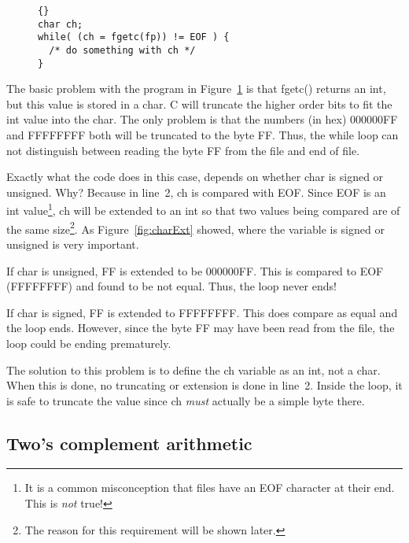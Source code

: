 \begin{figure}[t]
\begin{lstlisting}[stepnumber=0,frame=tlrb]{}
char ch;
while( (ch = fgetc(fp)) != EOF ) {
  /* do something with ch */
}
\end{lstlisting}
\caption{}
\label{fig:IObug}
\end{figure}

The basic problem with the program in Figure~\ref{fig:IObug} is that
{\code fgetc()} returns an {\code int}, but this value is stored in a
{\code char}. C will truncate the higher order bits to fit the {\code
int} value into the {\code char}. The only problem is that the numbers
(in hex) {\code 000000FF} and {\code FFFFFFFF} both will be truncated
to the byte {\code FF}. Thus, the while loop can not distinguish
between reading the byte {\code FF} from the file and end of file.

Exactly what the code does in this case, depends on whether {\code char} is
signed or unsigned. Why? Because in line~2, {\code ch} is compared with 
{\code EOF}. Since {\code EOF} is an {\code int} value\footnote{It is a
common misconception that files have an EOF character at their end. This is
\emph{not} true!}, {\code ch} will be
extended to an {\code int} so that two values being compared are of the
same size\footnote{The reason for this requirement will be shown later.}.
As Figure~\ref{fig:charExt} showed, where the variable is signed or 
unsigned is very important.

If {\code char} is unsigned, {\code FF} is extended to be {\code
000000FF}. This is compared to {\code EOF} ({\code FFFFFFFF}) and
found to be not equal. Thus, the loop never ends!

If {\code char} is signed, {\code FF} is extended to {\code
FFFFFFFF}. This does compare as equal and the loop ends. However,
since the byte {\code FF} may have been read from the file, the loop
could be ending prematurely.

The solution to this problem is to define the {\code ch} variable as an
{\code int}, not a {\code char}. When this is done, no truncating or
extension is done in line~2. Inside the loop, it is safe to truncate the
value since {\code ch} \emph{must} actually be a simple byte there.


\subsection{Two's complement arithmetic }

